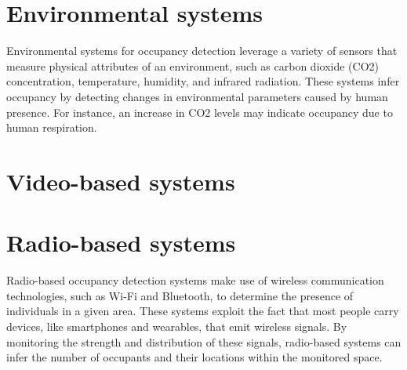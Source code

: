 

\section{Environmental systems}\label{sec:presence_env}
Environmental systems for occupancy detection leverage a variety of sensors that measure physical attributes of an environment, such as carbon dioxide (CO2) concentration, temperature, humidity, and infrared radiation.
These systems infer occupancy by detecting changes in environmental parameters caused by human presence.
For instance, an increase in CO2 levels may indicate occupancy due to human respiration.\cite{longoAccurateOccupancyEstimation2019}
% 

\section{Video-based systems}\label{sec:presence_video}
% 

\section{Radio-based systems}\label{sec:presence_radio}
Radio-based occupancy detection systems make use of wireless communication technologies, such as Wi-Fi and Bluetooth, to determine the presence of individuals in a given area.
These systems exploit the fact that most people carry devices, like smartphones and wearables, that emit wireless signals.
By monitoring the strength and distribution of these signals, radio-based systems can infer the number of occupants and their locations within the monitored space.\cite{longoAccurateOccupancyEstimation2019, teissedre-2019}


